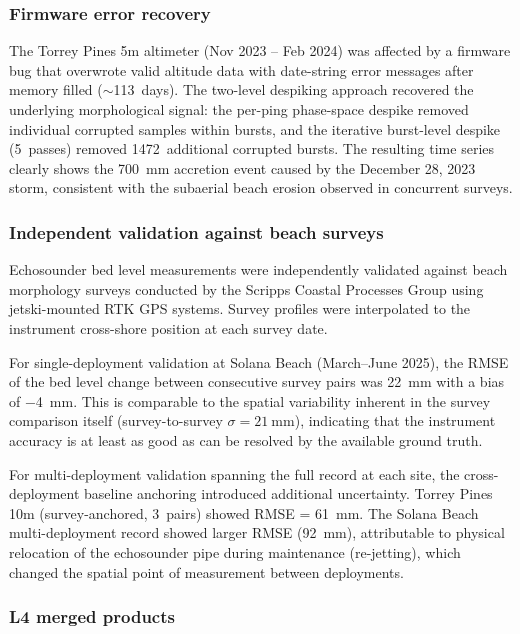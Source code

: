 \subsubsection{Firmware error recovery}

The Torrey Pines 5m altimeter (Nov 2023 -- Feb 2024) was affected by
a firmware bug that overwrote valid altitude data with date-string
error messages after memory filled ($\sim$113~days). The two-level
despiking approach recovered the underlying morphological signal:
the per-ping phase-space despike removed individual corrupted samples
within bursts, and the iterative burst-level despike (5~passes)
removed 1472~additional corrupted bursts. The resulting time series
clearly shows the \SI{700}{\milli\meter} accretion event caused by
the December 28, 2023 storm, consistent with the subaerial beach
erosion observed in concurrent surveys.

\subsubsection{Independent validation against beach surveys}

Echosounder bed level measurements were independently validated
against beach morphology surveys conducted by the Scripps Coastal
Processes Group using jetski-mounted RTK GPS systems. Survey profiles
were interpolated to the instrument cross-shore position at each
survey date.

For single-deployment validation at Solana Beach (March--June 2025),
the RMSE of the bed level change between consecutive survey pairs was
\SI{22}{\milli\meter} with a bias of \SI{-4}{\milli\meter}. This is
comparable to the spatial variability inherent in the survey comparison
itself (survey-to-survey $\sigma = \SI{21}{\milli\meter}$), indicating
that the instrument accuracy is at least as good as can be resolved by
the available ground truth.

For multi-deployment validation spanning the full record at each site,
the cross-deployment baseline anchoring introduced additional
uncertainty. Torrey Pines 10m (survey-anchored, 3~pairs) showed
RMSE = \SI{61}{\milli\meter}. The Solana Beach multi-deployment record
showed larger RMSE (\SI{92}{\milli\meter}), attributable to physical
relocation of the echosounder pipe during maintenance (re-jetting),
which changed the spatial point of measurement between deployments.

\subsubsection{L4 merged products}

